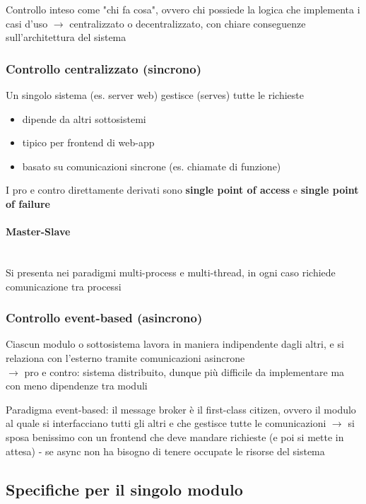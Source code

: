 Controllo inteso come "chi fa cosa", ovvero chi possiede la logica che implementa i casi d'uso $\rightarrow$ centralizzato o decentralizzato, con chiare conseguenze sull'architettura del sistema

\subsubsection{Controllo centralizzato (sincrono)}

Un singolo sistema (es. server web) gestisce (serves) tutte le richieste
\begin{itemize}
  \item dipende da altri sottosistemi
  \item tipico per frontend di web-app
  \item basato su comunicazioni sincrone (es. chiamate di funzione)
\end{itemize}

I pro e contro direttamente derivati sono \textbf{single point of access} e \textbf{single point of failure}

\paragraph{Master-Slave}~\\

Si presenta nei paradigmi multi-process e multi-thread, in ogni caso richiede comunicazione tra processi

\subsubsection{Controllo event-based (asincrono)}

Ciascun modulo o sottosistema lavora in maniera indipendente dagli altri, e si relaziona con l'esterno tramite comunicazioni asincrone\\
$\rightarrow$ pro e contro: sistema distribuito, dunque pi\`u difficile da implementare ma con meno dipendenze tra moduli

Paradigma event-based: il message broker \`e il first-class citizen, ovvero il modulo al quale si interfacciano tutti gli altri e che gestisce tutte le comunicazioni $\rightarrow$ si sposa benissimo con un frontend che deve mandare richieste (e poi si mette in attesa) - se async non ha bisogno di tenere occupate le risorse del sistema

\subsection{Specifiche per il singolo modulo}

